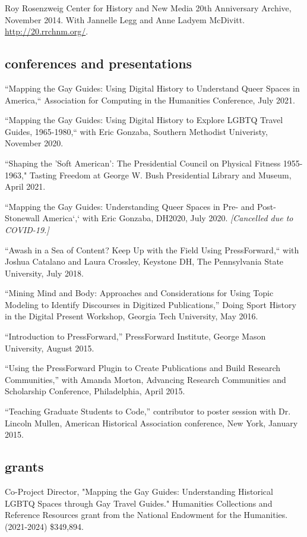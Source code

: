 \documentclass[11pt]{article}
\begin{document}
Roy Rosenzweig Center for History and New Media 20th Anniversary Archive, November 2014. With Jannelle Legg and Anne Ladyem McDivitt. \url{http://20.rrchnm.org/}.


\subsection{conferences and presentations}
``Mapping the Gay Guides: Using Digital History to Understand Queer Spaces in America,`` Association for Computing in the Humanities Conference, July 2021.

``Mapping the Gay Guides: Using Digital History to Explore LGBTQ Travel Guides, 1965-1980,`` with Eric Gonzaba, Southern Methodist Univeristy, November 2020.

“Shaping the ’Soft American’: The Presidential Council on Physical Fitness 1955-1963," Tasting Freedom at George W. Bush Presidential Library and Museum, April 2021.

``Mapping the Gay Guides: Understanding Queer Spaces in Pre- and Post-Stonewall America`,` with Eric Gonzaba, DH2020, July 2020. \emph{[Cancelled due to COVID-19.]}

``Awash in a Sea of Content? Keep Up with the Field Using PressForward,`` with Joshua Catalano and Laura Crossley, Keystone DH, The Pennsylvania State University, July 2018.

``Mining Mind and Body: Approaches and Considerations for Using Topic Modeling to Identify Discourses in Digitized Publications,'' Doing Sport History in the Digital Present Workshop, Georgia Tech University, May 2016.

``Introduction to PressForward,'' PressForward Institute, George Mason University, August 2015.

``Using the PressForward Plugin to Create Publications and Build Research Communities,'' with Amanda Morton, Advancing Research Communities and Scholarship Conference, Philadelphia, April 2015.

``Teaching Graduate Students to Code,'' contributor to poster session with Dr. Lincoln Mullen, American Historical Association conference, New York, January 2015.

\subsection{grants}
Co-Project Director, "Mapping the Gay Guides: Understanding Historical LGBTQ Spaces through Gay Travel Guides." Humanities Collections and Reference Resources grant from the National Endowment for the Humanities. (2021-2024) \$349,894.
\end{document}
